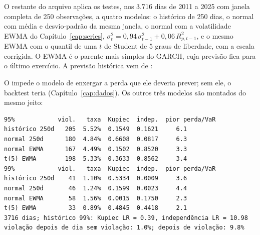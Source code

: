 

O restante do arquivo aplica os testes, nos 3.716 dias de 2011 a 2025 com janela completa de 250 observações, a quatro modelos: o histórico de 250 dias, o normal com média e desvio-padrão da mesma janela, o normal com a volatilidade EWMA do Capítulo~\ref{cap:series}, $\sigma_t^2 = 0,94\,\sigma_{t-1}^2 + 0,06\,R_{p,t-1}^2$, e o mesmo EWMA com o quantil de uma $t$ de Student de 5 graus de liberdade, com a escala corrigida. O EWMA é o parente mais simples do GARCH, cuja previsão fica para o último exercício. A previsão histórica vem de :



O  impede o modelo de enxergar a perda que ele deveria prever; sem ele, o backtest teria  (Capítulo~\ref{cap:dados}). Os outros três modelos são montados do mesmo jeito:


\begin{lstlisting}[style=saida]
95%            viol.   taxa  Kupiec  indep.  pior perda/VaR
histórico 250d   205  5.52%  0.1549  0.1621     6.1
normal 250d      180  4.84%  0.6608  0.0817     6.3
normal EWMA      167  4.49%  0.1502  0.8520     3.3
t(5) EWMA        198  5.33%  0.3633  0.8562     3.4
99%            viol.   taxa  Kupiec  indep.  pior perda/VaR
histórico 250d    41  1.10%  0.5334  0.0009     3.6
normal 250d       46  1.24%  0.1599  0.0023     4.4
normal EWMA       58  1.56%  0.0015  0.1750     2.3
t(5) EWMA         33  0.89%  0.4845  0.4418     2.1
3716 dias; histórico 99%: Kupiec LR = 0.39, independência LR = 10.98
violação depois de dia sem violação: 1.0%; depois de violação: 9.8%
\end{lstlisting}

